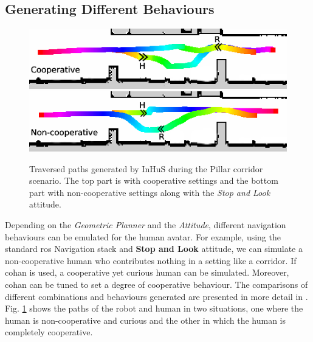 \subsection{Generating Different Behaviours}
\begin{figure}[!h]
    \centering
    \includegraphics[width=0.9\columnwidth]{images/appendix/paths_coop_new.png}
    \includegraphics[width=0.9\columnwidth]{images/appendix/paths_stop_new.png}
    \caption{Traversed paths generated by InHuS during the Pillar corridor scenario. The top part is with cooperative settings and the bottom part with non-cooperative settings along with the \textit{Stop and Look} attitude.}
    \label{fig:paths_pillar_corridor_inhus}
\end{figure}
Depending on the \textit{Geometric Planner} and the \textit{Attitude}, different navigation behaviours can be emulated for the human avatar. For example, using the standard \acrshort{ros} Navigation stack and \textbf{Stop and Look} attitude, we can simulate a non-cooperative human who contributes nothing in a setting like a corridor. If \acrshort{cohan} is used, a cooperative yet curious human can be simulated. Moreover, \acrshort{cohan} can be tuned to set a degree of cooperative behaviour. The comparisons of different combinations and behaviours generated are presented in more detail in \cite{favier2021simulating}. Fig. \ref{fig:paths_pillar_corridor_inhus} shows the paths of the robot and human in two situations, one where the human is non-cooperative and curious and the other in which the human is completely cooperative.

